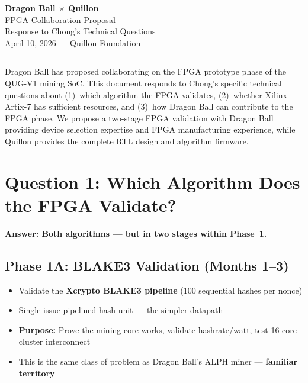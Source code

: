 \documentclass[11pt,a4paper]{article}
\begin{document}
\begin{center}
{\Huge\bfseries\color{qnkpurple} Dragon Ball $\times$ Quillon}\\[6pt]
{\LARGE\color{qnkslate} FPGA Collaboration Proposal}\\[12pt]
{\large\color{qnkslate} Response to Chong's Technical Questions}\\[6pt]
{\normalsize\color{qnkslate} April 10, 2026 --- Quillon Foundation}\\[4pt]
\textcolor{qnkpurple}{\rule{0.6\textwidth}{2pt}}
\end{center}

\vspace{1em}

\begin{keyinsight}
Dragon Ball has proposed collaborating on the FPGA prototype phase of the QUG-V1 mining SoC. This document responds to Chong's specific technical questions about (1)~which algorithm the FPGA validates, (2)~whether Xilinx Artix-7 has sufficient resources, and (3)~how Dragon Ball can contribute to the FPGA phase. We propose a two-stage FPGA validation with Dragon Ball providing device selection expertise and FPGA manufacturing experience, while Quillon provides the complete RTL design and algorithm firmware.
\end{keyinsight}

\section{Question 1: Which Algorithm Does the FPGA Validate?}

\textbf{Answer: Both algorithms --- but in two stages within Phase~1.}

\subsection{Phase 1A: BLAKE3 Validation (Months 1--3)}

\begin{itemize}[leftmargin=1.5em]
    \item Validate the \textbf{Xcrypto BLAKE3 pipeline} (100 sequential hashes per nonce)
    \item Single-issue pipelined hash unit --- the simpler datapath
    \item \textbf{Purpose:} Prove the mining core works, validate hashrate/watt, test 16-core cluster interconnect
    \item This is the same class of problem as Dragon Ball's ALPH miner --- \textbf{familiar territory}
\end{itemize}
\end{document}
